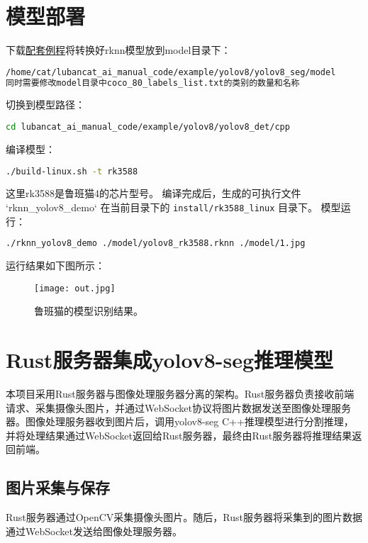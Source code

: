 \section{模型部署}
\noindent 下载\href{https://gitee.com/LubanCat/lubancat_ai_manual_code.git}{配套例程}将转换好rknn模型放到model目录下：
\begin{lstlisting}[language=bash, basicstyle=\ttfamily\small, keywordstyle=\color{blue}]
/home/cat/lubancat_ai_manual_code/example/yolov8/yolov8_seg/model
同时需要修改model目录中coco_80_labels_list.txt的类别的数量和名称
\end{lstlisting}
切换到模型路径：
\begin{lstlisting}[language=bash, basicstyle=\ttfamily\small, keywordstyle=\color{blue}]
cd lubancat_ai_manual_code/example/yolov8/yolov8_det/cpp
\end{lstlisting}
编译模型：
\begin{lstlisting}[language=bash, basicstyle=\ttfamily\small, keywordstyle=\color{blue}]
 ./build-linux.sh -t rk3588
\end{lstlisting}
这里rk3588是鲁班猫4的芯片型号。
编译完成后，生成的可执行文件 `rknn\_yolov8\_demo` 在当前目录下的 \texttt{install/rk3588\_linux} 目录下。
模型运行：
\begin{lstlisting}[language=bash, basicstyle=\ttfamily\small, keywordstyle=\color{blue}]
./rknn_yolov8_demo ./model/yolov8_rk3588.rknn ./model/1.jpg
\end{lstlisting}
运行结果如下图所示：
\begin{figure}[h!]  %
    \centering  %
    \texttt{[image: out.jpg]}  %
    \caption{鲁班猫的模型识别结果。}  %
\end{figure}

\section{Rust服务器集成yolov8-seg推理模型}
本项目采用Rust服务器与图像处理服务器分离的架构。Rust服务器负责接收前端请求、采集摄像头图片，并通过WebSocket协议将图片数据发送至图像处理服务器。图像处理服务器收到图片后，调用yolov8-seg C++推理模型进行分割推理，并将处理结果通过WebSocket返回给Rust服务器，最终由Rust服务器将推理结果返回前端。
\subsection{图片采集与保存}
Rust服务器通过OpenCV采集摄像头图片。随后，Rust服务器将采集到的图片数据通过WebSocket发送给图像处理服务器。

